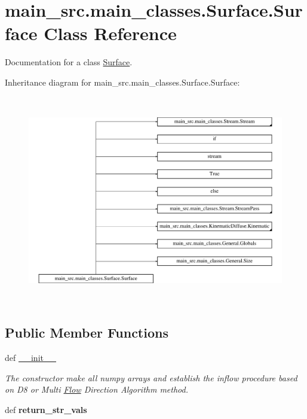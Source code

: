 \hypertarget{classmain__src_1_1main__classes_1_1Surface_1_1Surface}{\section{main\-\_\-src.\-main\-\_\-classes.\-Surface.\-Surface Class Reference}
\label{classmain__src_1_1main__classes_1_1Surface_1_1Surface}
}


Documentation for a class \hyperlink{classmain__src_1_1main__classes_1_1Surface_1_1Surface}{Surface}.  


Inheritance diagram for main\-\_\-src.\-main\-\_\-classes.\-Surface.\-Surface\-:\begin{figure}[H]
\begin{center}
\leavevmode
\includegraphics[height=9.150327cm]{classmain__src_1_1main__classes_1_1Surface_1_1Surface}
\end{center}
\end{figure}
\subsection*{Public Member Functions}
\begin{DoxyCompactItemize}
\item 
\hypertarget{classmain__src_1_1main__classes_1_1Surface_1_1Surface_aa04b4bfa342c291478c1bf86179ee143}{def \hyperlink{classmain__src_1_1main__classes_1_1Surface_1_1Surface_aa04b4bfa342c291478c1bf86179ee143}{\-\_\-\-\_\-init\-\_\-\-\_\-}}\label{classmain__src_1_1main__classes_1_1Surface_1_1Surface_aa04b4bfa342c291478c1bf86179ee143}

\begin{DoxyCompactList}\small\item\em The constructor make all numpy arrays and establish the inflow procedure based on D8 or Multi \hyperlink{namespacemain__src_1_1main__classes_1_1Flow}{Flow} Direction Algorithm method. \end{DoxyCompactList}\item 
\hypertarget{classmain__src_1_1main__classes_1_1Surface_1_1Surface_a2fd7e71b3f8711013123d2ee0ce5bf3d}{def {\bfseries return\-\_\-str\-\_\-vals}}\label{classmain__src_1_1main__classes_1_1Surface_1_1Surface_a2fd7e71b3f8711013123d2ee0ce5bf3d}

\end{DoxyCompactItemize}

